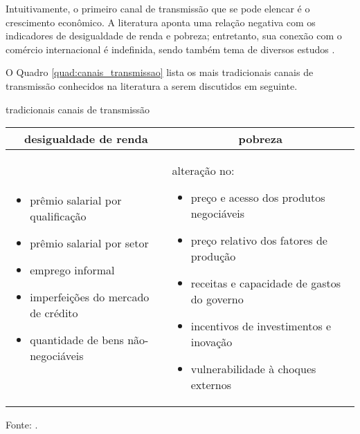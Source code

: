 Intuitivamente, o primeiro canal de transmissão que se pode elencar é o crescimento econômico. A literatura aponta uma relação negativa com os indicadores de desigualdade de renda e pobreza; entretanto, sua conexão com o comércio internacional é indefinida, sendo também tema de diversos estudos \cite{anderson16, dix17, gnangnon18}.

O Quadro \ref{quad:canais_transmissao} lista os mais tradicionais canais de transmissão conhecidos na literatura a serem discutidos em seguinte.

\begin{quadro}[h]
	\begin{threeparttable}
		\centering
		\caption{tradicionais canais de transmissão}
		\footnotesize
		\label{quad:canais_transmissao}
		\begin{tabular}{|| m{7cm} | m{7cm} ||}
			\hline \hline
			\multicolumn{1}{||c|}{\textbf{desigualdade de renda}} & \multicolumn{1}{c||}{\textbf{pobreza}} \\ \hline
			\begin{itemize}
				\item prêmio salarial por qualificação
				\item prêmio salarial por setor
				\item emprego informal
				\item imperfeições do mercado de crédito
				\item quantidade de bens não-negociáveis
			\end{itemize} &
			\vspace{0.2cm}
			alteração no:
			\begin{itemize}
			\item preço e acesso dos produtos negociáveis
			\item preço relativo dos fatores de produção
			\item receitas e capacidade de gastos do governo
			\item incentivos de investimentos e inovação
			\item vulnerabilidade à choques externos
			\end{itemize} \\ \hline \hline
		\end{tabular}
		\begin{tablenotes}
			\scriptsize
			\item Fonte: \textcite{bannisterthugge01, xu03, goldbergpavcnik04, banerjee04}.
		\end{tablenotes}
	\end{threeparttable}
\end{quadro}

